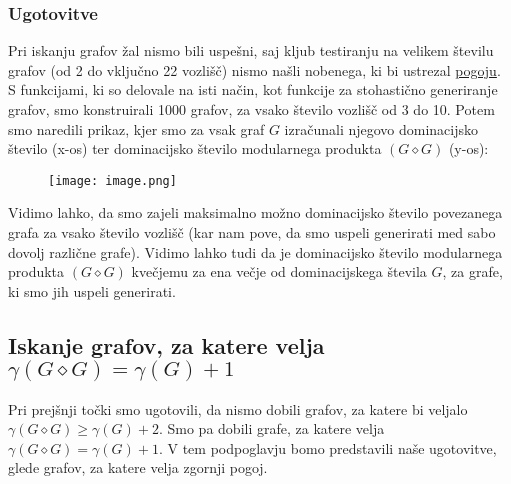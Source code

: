 \documentclass[a4paper,12pt]{article}
\theoremstyle{definition}
\begin{document}
\subsubsection{Ugotovitve}
Pri iskanju grafov žal nismo bili uspešni, saj kljub testiranju na velikem številu grafov (od 2 do vključno 22 vozlišč) nismo našli nobenega, ki bi ustrezal \hyperref[pogoj]{pogoju}. S funkcijami, ki so delovale na isti način, kot funkcije za stohastično generiranje grafov, smo konstruirali 1000 grafov, za vsako število vozlišč od 3 do 10. Potem smo naredili prikaz, kjer smo za vsak graf $G$ izračunali njegovo dominacijsko število (x-os) ter dominacijsko število modularnega produkta $(G \diamond G)$ (y-os):
\begin{figure}[h!]
    \centering
    \texttt{[image: image.png]}
\end{figure}

\noindent Vidimo lahko, da smo zajeli maksimalno možno dominacijsko število povezanega grafa za vsako število vozlišč (kar nam pove, da smo uspeli generirati med sabo dovolj različne grafe). Vidimo lahko tudi da je dominacijsko število modularnega produkta $(G \diamond G)$ kvečjemu za ena večje od dominacijskega števila $G$, za grafe, ki smo jih uspeli generirati.



\subsection{Iskanje grafov, za katere velja $\gamma(G \diamond G) = \gamma(G) + 1$}\label{nov_pogoj}
Pri prejšnji točki smo ugotovili, da nismo dobili grafov, za katere bi veljalo $\gamma(G \diamond G) \geq \gamma(G) + 2$. Smo pa dobili grafe, za katere velja $\gamma(G \diamond G) = \gamma(G) + 1$. V tem podpoglavju bomo predstavili naše ugotovitve, glede grafov, za katere velja zgornji pogoj.
\end{document}
